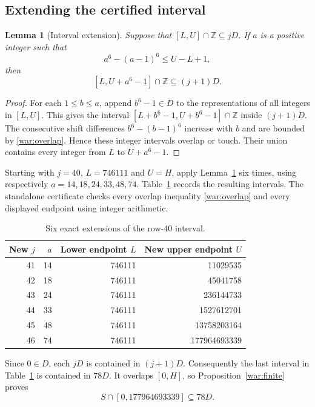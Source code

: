 \documentclass[11pt,a4paper]{article}
\numberwithin{equation}{section}
\newtheorem{lemma}[theorem]{Lemma}
\theoremstyle{remark}
\begin{document}
\subsection{Extending the certified interval}

\begin{lemma}[Interval extension]\label{war:interval}
Suppose that $[L,U]\cap\mathbb Z\subseteq jD$. If $a$ is a positive integer
such that
\begin{equation}\label{war:overlap}
 a^6-(a-1)^6\leq U-L+1,
\end{equation}
then
\[
 [L,U+a^6-1]\cap\mathbb Z\subseteq(j+1)D.
\]
\end{lemma}

\begin{proof}
For each $1\leq b\leq a$, append $b^6-1\in D$ to the representations of
all integers in $[L,U]$. This gives the interval
$[L+b^6-1,U+b^6-1]\cap\mathbb Z$ inside $(j+1)D$.
The consecutive shift differences $b^6-(b-1)^6$ increase with $b$ and are
bounded by \eqref{war:overlap}. Hence these integer intervals overlap or
touch. Their union contains every integer from $L$ to $U+a^6-1$.
\end{proof}

Starting with $j=40$, $L=746111$ and $U=H$, apply
Lemma~\ref{war:interval} six times, using respectively
$a=14,18,24,33,48,74$. Table~\ref{war:bridge-table} records the resulting
intervals. The standalone certificate checks every overlap inequality
\eqref{war:overlap} and every displayed endpoint using integer arithmetic.

\begin{table}[htbp]
\centering
\begin{tabular}{r|r|r|r}
New $j$ & $a$ & Lower endpoint $L$ & New upper endpoint $U$\\
\hline
41 & 14 & 746111 & 11029535\\
42 & 18 & 746111 & 45041758\\
43 & 24 & 746111 & 236144733\\
44 & 33 & 746111 & 1527612701\\
45 & 48 & 746111 & 13758203164\\
46 & 74 & 746111 & 177964693339
\end{tabular}
\caption{Six exact extensions of the row-$40$ interval.}
\label{war:bridge-table}
\end{table}

Since $0\in D$, each $jD$ is contained in $(j+1)D$. Consequently the last
interval in Table~\ref{war:bridge-table} is contained in $78D$.
It overlaps $[0,H]$, so Proposition~\ref{war:finite} proves
\begin{equation}\label{war:bridge}
 S\cap[0,177964693339]\subseteq78D.
\end{equation}
\end{document}
